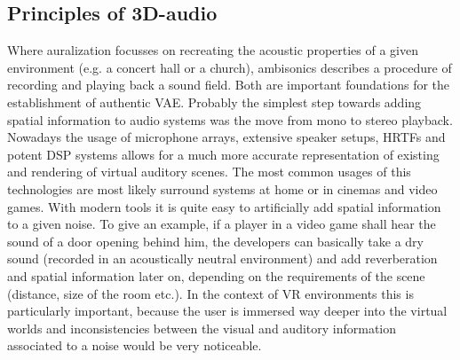 \documentclass[a4paper,11pt]{article}%
\renewcommand{\\}{\vspace*{0.5\baselineskip} \newline}
\begin{document}
\subsection{Principles of 3D-audio}
\label{Sec:auralization}
Where auralization focusses on recreating the acoustic properties of a given environment (e.g. a concert hall or a church), ambisonics describes a procedure of recording and playing back a sound field. Both are important foundations for the establishment of authentic \acf{VAE}. 
\newline
\newline
Probably the simplest step towards adding spatial information to audio systems was the move from mono to stereo playback. Nowadays the usage of microphone arrays, extensive speaker setups, \ac{HRTF}s and potent \acs{DSP} systems allows for a much more accurate representation of existing and rendering of virtual auditory scenes.
\newline
\newline
The most common usages of this technologies are most likely surround systems at home or in cinemas and video games. With modern tools it is quite easy to artificially add spatial information to a given noise. To give an example, if a player in a video game shall hear the sound of a door opening behind him, the developers can basically take a \dq dry\dq{} sound (recorded in an acoustically neutral environment) and add reverberation and spatial information later on, depending on the requirements of the scene (distance, size of the room etc.).
\newline
\newline
In the context of \ac{VR} environments this is particularly important, because the user is immersed way deeper into the virtual worlds and inconsistencies between the visual and auditory information associated to a noise would be very noticeable. %
\end{document}
